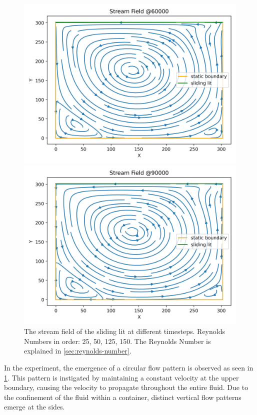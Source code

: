 \begin{figure}[H]
\begin{minipage}{0.5\textwidth}
        \includegraphics[width=\linewidth]{graphs/SlidingLit/stream_field_60000}
    \end{minipage}%
    \begin{minipage}{0.5\textwidth}
        \includegraphics[width=\linewidth]{graphs/SlidingLit/stream_field_90000}
    \end{minipage}
    \caption{
        The stream field of the sliding lit at different timesteps. Reynolds Numbers in order: 25, 50, 125, 150. The Reynolds Number is explained in \cref{sec:reynolds-number}.
    }
    \label{fig:sl-stream-field}
\end{figure}

In the experiment, the emergence of a circular flow pattern is observed as seen in \cref{fig:sl-stream-field}.
This pattern is instigated by maintaining a constant velocity at the upper boundary, causing the velocity to propagate throughout the entire fluid.
Due to the confinement of the fluid within a container, distinct vertical flow patterns emerge at the sides.
\pagebreak

